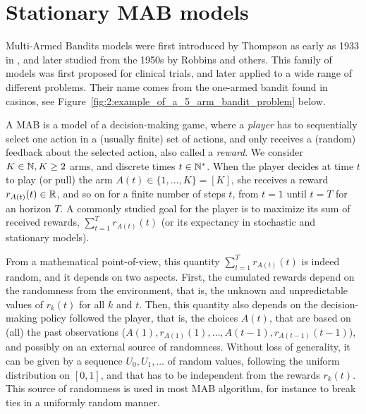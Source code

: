 \section{Stationary MAB models}
\label{sec:2:notations}


Multi-Armed Bandits models were first introduced by Thompson as early as 1933 in \cite{Thompson33}, and later studied from the 1950s by Robbins \cite{Robbins52} and others.
This family of models was first proposed for clinical trials, and later applied to a wide range of different problems.
Their name comes from the one-armed bandit found in casinos, see Figure~\ref{fig:2:example_of_a_5_arm_bandit_problem} below.


A MAB is a model of a decision-making game, where a \emph{player} has to sequentially select one action in a (usually finite) set of actions, and only receives a (random) feedback about the selected action, also called a \emph{reward}.
We consider $K\in\mathbb{N}, K\geq2$ arms, and discrete times $t\in\mathbb{N}^*$.
When the player decides at time $t$ to play (or pull) the arm $A(t)\in\{1,\dots,K\}=[K]$, she receives a reward $r_{A(t)}(t)\in\mathbb{R}$, and so on for a finite number of steps $t$, from $t=1$ until $t=T$ for an horizon $T$.
%
A commonly studied goal for the player is to maximize its sum of received rewards, $\sum_{t=1}^T r_{A(t)}(t)$
(or its expectancy in stochastic and stationary models).

From a mathematical point-of-view, this quantity $\sum_{t=1}^T r_{A(t)}(t)$ is indeed random, and it depends on two aspects.
First, the cumulated rewards depend on the randomness from the environment, that is, the unknown and unpredictable values of $r_k(t)$ for all $k$ and $t$.
Then, this quantity also depends on the decision-making policy followed the player, that is, the choices $A(t)$, that are based on (all) the past observations ($A(1), r_{A(1)}(1), \dots, A(t-1), r_{A(t-1)}(t-1)$), and possibly on an external source of randomness.
Without loss of generality, it can be given by a sequence $U_0,U_1,\dots$ of \iid{} random values, following the uniform distribution on $[0,1]$, and that has to be independent from the rewards $r_k(t)$.
This source of randomness is used in most MAB algorithm, for instance to break ties in a uniformly random manner.


